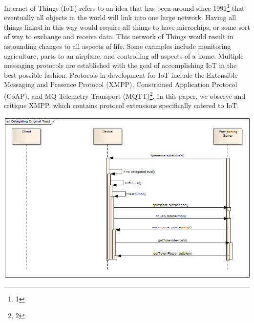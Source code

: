 Internet of Things (IoT) refers to an idea that has been around since
1991\footnote{1} that eventually all objects in the world will link into
one large network. Having all things linked in this way would require all
things to have microchips, or some sort of way to exchange and receive data.
This network of Things would result in astounding changes to all aspects of
life. Some examples include monitoring agriculture, parts to an airplane, and
controlling all aspects of a home. Multiple messaging protocols are
established with the goal of accomplishing IoT in the best possible fashion.
Protocols in development for IoT include the Extensible Messaging and Presence
Protocol (XMPP), Constrained Application Protocol (CoAP), and MQ Telemetry
Transport (MQTT)\footnote{2}. In this paper, we observe and critique XMPP,
which contains protocol extensions specifically catered to IoT.

\includegraphics[scale=.25]{images/delegatingTrustSimpleNode}

